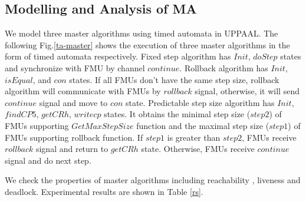 \subsection{Modelling and Analysis of MA} 
We model three master algorithms using timed automata in UPPAAL. The following Fig.\ref{ta-master} shows the execution of three master algorithms in the form of timed automata respectively. Fixed step algorithm has $Init$, $doStep$ states and synchronize with FMU by channel $continue$. Rollback algorithm has $Init$, $isEqual$, and $con$ states. If all FMUs don't have the same step size, rollback algorithm will communicate with FMUs by $rollback$ signal, otherwise, it will send $continue$ signal and move to $con$ state. Predictable step size algorithm has $Init$, $findCP5$, $getCRh$, $writecp$ states. It obtains the minimal step size ($step2$) of FMUs supporting $GetMaxStepSize$ function and the maximal step size ($step1$) of FMUs supporting rollback function. If $step1$ is greater than $step2$, FMUs receive $rollback$ signal and return to $getCRh$ state. Otherwise, FMUs receive $continue$ signal and do next step.  
\begin{figure}[htbp]
\end{figure}
We check the properties of master algorithms including reachability , liveness and deadlock. Experimental results are shown in Table \ref{rs}.

